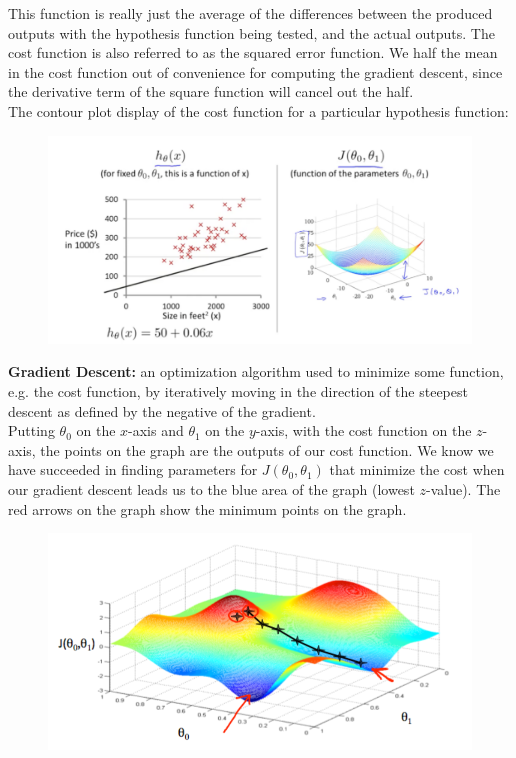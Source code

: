 \documentclass{article}
\begin{document}
        \noindent This function is really just the average of the differences between the produced outputs
        with the hypothesis function being tested, and the actual outputs. The cost function is also referred
        to as the squared error function. We half the mean in the cost function out of convenience for
        computing the gradient descent, since the derivative term of the square function will cancel out the
        half. \\

        \noindent The contour plot display of the cost function for a particular hypothesis function:

        \begin{figure}[hbt!]
            \centering
            \includegraphics[scale=0.75]{Resources/Contour.PNG}
        \end{figure}

        \noindent \textbf{Gradient Descent:} an optimization algorithm used to minimize some function, e.g. the
        cost function, by iteratively moving in the direction of the steepest descent as defined by the negative
        of the gradient. \\

        \noindent Putting $\theta_0$ on the $x$-axis and $\theta_1$ on the $y$-axis, with the cost function
        on the $z$-axis, the points on the graph are the outputs of our cost function. We know we have succeeded
        in finding parameters for $J(\theta_0,\theta_1)$ that minimize the cost when our gradient descent leads
        us to the blue area of the graph (lowest $z$-value). The red arrows on the graph show the minimum points
        on the graph.

        \begin{figure}[hbt!]
            \centering
            \includegraphics[scale=0.75]{Resources/Gradient_Descent}
        \end{figure}
\end{document}
